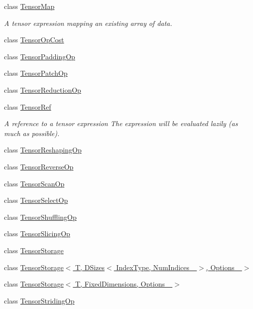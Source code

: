 \begin{DoxyCompactItemize}
\item 
class \hyperlink{class_eigen_1_1_tensor_map}{Tensor\+Map}
\begin{DoxyCompactList}\small\item\em A tensor expression mapping an existing array of data. \end{DoxyCompactList}\item 
class \hyperlink{class_eigen_1_1_tensor_op_cost}{Tensor\+Op\+Cost}
\item 
class \hyperlink{class_eigen_1_1_tensor_padding_op}{Tensor\+Padding\+Op}
\item 
class \hyperlink{class_eigen_1_1_tensor_patch_op}{Tensor\+Patch\+Op}
\item 
class \hyperlink{class_eigen_1_1_tensor_reduction_op}{Tensor\+Reduction\+Op}
\item 
class \hyperlink{class_eigen_1_1_tensor_ref}{Tensor\+Ref}
\begin{DoxyCompactList}\small\item\em A reference to a tensor expression The expression will be evaluated lazily (as much as possible). \end{DoxyCompactList}\item 
class \hyperlink{class_eigen_1_1_tensor_reshaping_op}{Tensor\+Reshaping\+Op}
\item 
class \hyperlink{class_eigen_1_1_tensor_reverse_op}{Tensor\+Reverse\+Op}
\item 
class \hyperlink{class_eigen_1_1_tensor_scan_op}{Tensor\+Scan\+Op}
\item 
class \hyperlink{class_eigen_1_1_tensor_select_op}{Tensor\+Select\+Op}
\item 
class \hyperlink{class_eigen_1_1_tensor_shuffling_op}{Tensor\+Shuffling\+Op}
\item 
class \hyperlink{class_eigen_1_1_tensor_slicing_op}{Tensor\+Slicing\+Op}
\item 
class \hyperlink{class_eigen_1_1_tensor_storage}{Tensor\+Storage}
\item 
class \hyperlink{class_eigen_1_1_tensor_storage_3_01_t_00_01_d_sizes_3_01_index_type_00_01_num_indices___01_4_00_01_options___01_4}{Tensor\+Storage$<$ T, D\+Sizes$<$ Index\+Type, Num\+Indices\+\_\+ $>$, Options\+\_\+ $>$}
\item 
class \hyperlink{class_eigen_1_1_tensor_storage_3_01_t_00_01_fixed_dimensions_00_01_options___01_4}{Tensor\+Storage$<$ T, Fixed\+Dimensions, Options\+\_\+ $>$}
\item 
class \hyperlink{class_eigen_1_1_tensor_striding_op}{Tensor\+Striding\+Op}

\end{DoxyCompactItemize}
